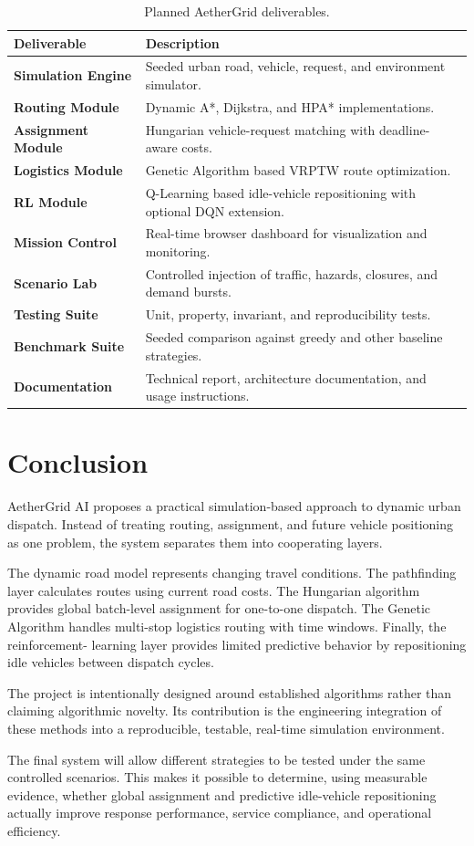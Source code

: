\documentclass[12pt,a4paper]{article}
\begin{document}
\begin{table}[ht]
\centering
\renewcommand{\arraystretch}{1.35}
\begin{tabularx}{\textwidth}{>{\bfseries}p{3.5cm}X}
\toprule
Deliverable & Description \\
\midrule
Simulation Engine & Seeded urban road, vehicle, request, and environment simulator. \\
Routing Module & Dynamic A*, Dijkstra, and HPA* implementations. \\
Assignment Module & Hungarian vehicle-request matching with deadline-aware costs. \\
Logistics Module & Genetic Algorithm based VRPTW route optimization. \\
RL Module & Q-Learning based idle-vehicle repositioning with optional DQN extension. \\
Mission Control & Real-time browser dashboard for visualization and monitoring. \\
Scenario Lab & Controlled injection of traffic, hazards, closures, and demand bursts. \\
Testing Suite & Unit, property, invariant, and reproducibility tests. \\
Benchmark Suite & Seeded comparison against greedy and other baseline strategies. \\
Documentation & Technical report, architecture documentation, and usage instructions. \\
\bottomrule
\end{tabularx}
\caption{Planned AetherGrid deliverables.}
\label{tab:deliverables}
\end{table}





\section{Conclusion}

AetherGrid AI proposes a practical simulation-based approach to
dynamic urban dispatch. Instead of treating routing, assignment, and
future vehicle positioning as one problem, the system separates them
into cooperating layers.

The dynamic road model represents changing travel conditions. The
pathfinding layer calculates routes using current road costs. The
Hungarian algorithm provides global batch-level assignment for
one-to-one dispatch. The Genetic Algorithm handles multi-stop
logistics routing with time windows. Finally, the reinforcement-
learning layer provides limited predictive behavior by repositioning
idle vehicles between dispatch cycles.

The project is intentionally designed around established algorithms
rather than claiming algorithmic novelty. Its contribution is the
engineering integration of these methods into a reproducible,
testable, real-time simulation environment.

The final system will allow different strategies to be tested under
the same controlled scenarios. This makes it possible to determine,
using measurable evidence, whether global assignment and predictive
idle-vehicle repositioning actually improve response performance,
service compliance, and operational efficiency.
\end{document}
